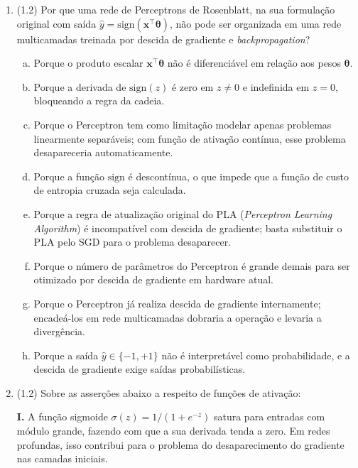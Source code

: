 \documentclass[11pt,a4paper]{article}
\begin{document}
\begin{enumerate}[1)]

\item (1.2) Por que uma rede de Perceptrons de Rosenblatt, na sua formulação original com saída $\hat{y} = \mathrm{sign}(\mathbf{x}^\top \boldsymbol{\theta})$, não pode ser organizada em uma rede multicamadas treinada por descida de gradiente e \textit{backpropagation}?
\begin{enumerate}[a)]
    \item Porque o produto escalar $\mathbf{x}^\top \boldsymbol{\theta}$ não é diferenciável em relação aos pesos $\boldsymbol{\theta}$.
    \item Porque a derivada de $\mathrm{sign}(z)$ é zero em $z \neq 0$ e indefinida em $z = 0$, bloqueando a regra da cadeia.
    \item Porque o Perceptron tem como limitação modelar apenas problemas linearmente separáveis; com função de ativação contínua, esse problema desapareceria automaticamente.
    \item Porque a função $\mathrm{sign}$ é descontínua, o que impede que a função de custo de entropia cruzada seja calculada.
    \item Porque a regra de atualização original do PLA (\textit{Perceptron Learning Algorithm}) é incompatível com descida de gradiente; basta substituir o PLA pelo SGD para o problema desaparecer.
    \item Porque o número de parâmetros do Perceptron é grande demais para ser otimizado por descida de gradiente em hardware atual.
    \item Porque o Perceptron já realiza descida de gradiente internamente; encadeá-los em rede multicamadas dobraria a operação e levaria a divergência.
    \item Porque a saída $\hat{y} \in \{-1, +1\}$ não é interpretável como probabilidade, e a descida de gradiente exige saídas probabilísticas.
\end{enumerate}

\pagebreak

\item (1.2) Sobre as asserções abaixo a respeito de funções de ativação:

\textbf{I.} A função sigmoide $\sigma(z) = 1/(1 + e^{-z})$ satura para entradas com módulo grande, fazendo com que a sua derivada tenda a zero. Em redes profundas, isso contribui para o problema do desaparecimento do gradiente nas camadas iniciais.


\end{enumerate}
\end{document}
